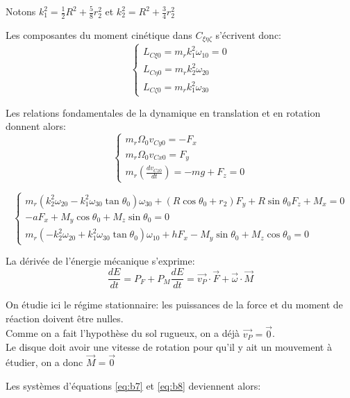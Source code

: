 Notons $k_1^2=\frac{1}{2}R^2+\frac{5}{8}r_2^2$ et $k_2^2=R^2+\frac{3}{4}r_2^2$

Les composantes du moment cinétique dans $C_{\xi \eta \zeta}$ s'écrivent donc:
\begin{equation}
  \begin{cases}
    L_{C\xi 0}=m_r k_1^2 \omega_{10}=0 \\
    L_{C\eta 0}=m_r k_2^2 \omega_{20}\\
    L_{C\zeta 0}=m_r k_1^2 \omega_{30}
  \end{cases}
  \label{eq:b6}
\end{equation}


Les relations fondamentales de la dynamique en translation et en rotation donnent alors:
\begin{equation}
  \begin{cases}
    m_r\Omega_0 v_{Cy0}=-F_x \\
    m_r \Omega_0 v_{Cx0}=F_y\\
    m_r(\frac{dv_{Cz0}}{dt})=-mg+F_z=0
  \end{cases}
  \label{eq:b7}
\end{equation}


\begin{equation}
  \begin{cases}
    m_r(k_2^2\omega_{20}-k_1^2\omega_{30} \tan{\theta_0})\omega_{30} +(R\cos{\theta_0}+r_2)F_y + R\sin{\theta_0}F_z + M_x =0\\
    -aF_x + M_y \cos{\theta_0} +M_z \sin{\theta_0}=0\\
    m_r(-k_2^2\omega_{20}+k_1^2\omega_{30} \tan{\theta_0})\omega_{10} + hF_x - M_y \sin{\theta_0} +M_z \cos{\theta_0}=0
  \end{cases}
  \label{eq:b8}
\end{equation}

La dérivée de l'énergie mécanique s'exprime: 
$$
\frac{dE}{dt}=P_F + P_M
\frac{dE}{dt}=\vec{v_P} \cdot \vec{F} + \vec{\omega} \cdot \vec{M}
$$

On étudie ici le régime stationnaire: les puissances de la force et du moment de réaction doivent être nulles. \\
Comme on a fait l'hypothèse du sol rugueux, on a déjà $\vec{v_P}=\vec{0}$. \\
Le disque doit avoir une vitesse de rotation pour qu'il y ait un mouvement à étudier, on a donc $\vec{M}=\vec{0}$

Les systèmes d'équations \ref{eq:b7} et \ref{eq:b8} deviennent alors:

